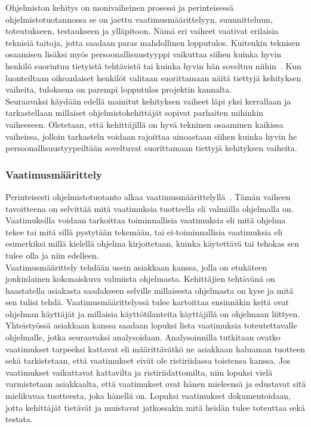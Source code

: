 \documentclass[finnish]{../tktltiki2}
\theoremstyle{definition}
\theoremstyle{remark}
\begin{document}
Ohjelmiston kehitys on monivaiheinen prosessi ja perinteisessä ohjelmistotuotannossa se on
jaettu vaatimusmäärittelyyn, suunnitteluun, toteutukseen, testaukseen
ja ylläpitoon. Nämä eri vaiheet vaativat erilaisia teknisiä taitoja,
jotta saadaan paras mahdollinen lopputulos. Kuitenkin teknisen
osaamisen lisäksi myös persoonallisuustyyppi vaikuttaa siihen kuinka
hyvin henkilö suoriutuu tietyistä tehtävistä tai kuinka hyvin hän
soveltuu niihin~\cite{Capretz:2010:MSS:1726559.1726574}. Kun luonteiltaan oikeanlaiset henkilöt valitaan suorittamaan
näitä tiettyjä kehityksen vaiheita, tuloksena on parempi lopputulos
projektin kannalta.\\

Seuraavaksi käydään edellä mainitut kehityksen vaiheet läpi yksi kerrallaan
ja tarkastellaan millaiset ohjelmistokehittäjät sopivat
parhaiten mihinkin vaiheeseen. Oletetaan, että kehittäjillä on
hyvä tekninen osaaminen kaikissa vaiheissa, jolloin tarkastelu
voidaan rajoittaa ainoastaan siihen kuinka hyvin he persoonallisuustyypeiltään soveltuvat suorittamaan tiettyjä
kehityksen vaiheita.

\subsubsection{Vaatimusmäärittely}

Perinteisesti ohjelmistotuotanto alkaa vaatimusmäärittelyllä~\cite{SWEBOK:409902,Sommerville:2005:IRE:1042197.1042341}. Tämän vaiheen tavoitteena on selvittää mitä vaatimuksia
tuotteella eli valmiilla ohjelmalla on. Vaatimuksilla voidaan tarkoittaa toiminnallisia vaatimuksia eli
mitä ohjelma tekee tai mitä sillä pystytään tekemään, tai ei-toiminnallisia vaatimuksia eli esimerkiksi millä kielellä
ohjelma kirjoitetaan, kuinka käytettävä tai tehokas sen tulee olla ja niin edelleen.\\

Vaatimusmäärittely tehdään usein asiakkaan kanssa, jolla on etukäteen jonkinlainen kokonaiskuva valmiista ohjelmasta.
Kehittäjien tehtävänä on haastatella asiakasta saadakseen selville millaisesta ohjelmasta on kyse ja mitä sen tulisi tehdä.
Vaatimusmäärittelyssä tulee kartoittaa ensinnäkin keitä ovat ohjelman käyttäjät ja millaisia käyttötilanteita
käyttäjillä on ohjelmaan liittyen. Yhteistyössä asiakkaan kanssa saadaan lopuksi lista vaatimuksia toteutettavalle ohjelmalle,
jotka seuraavaksi analysoidaan. Analysoinnilla tutkitaan ovatko vaatimukset tarpeeksi kattavat eli määrittävätkö ne asiakkaan
haluaman tuotteen sekä tarkistetaan, että vaatimukset eivät ole ristiriidassa toistensa kanssa. Jos vaatimukset vaikuttavat
kattavilta ja ristiriidattomilta, niin lopuksi vielä varmistetaan asiakkaalta, että vaatimukset ovat hänen mieleensä ja
edustavat sitä mielikuvaa tuotteesta, joka hänellä on.
Lopuksi vaatimukset dokumentoidaan, jotta kehittäjät tietävät ja muistavat jatkossakin mitä heidän tulee toteuttaa sekä testata.\\
\end{document}
